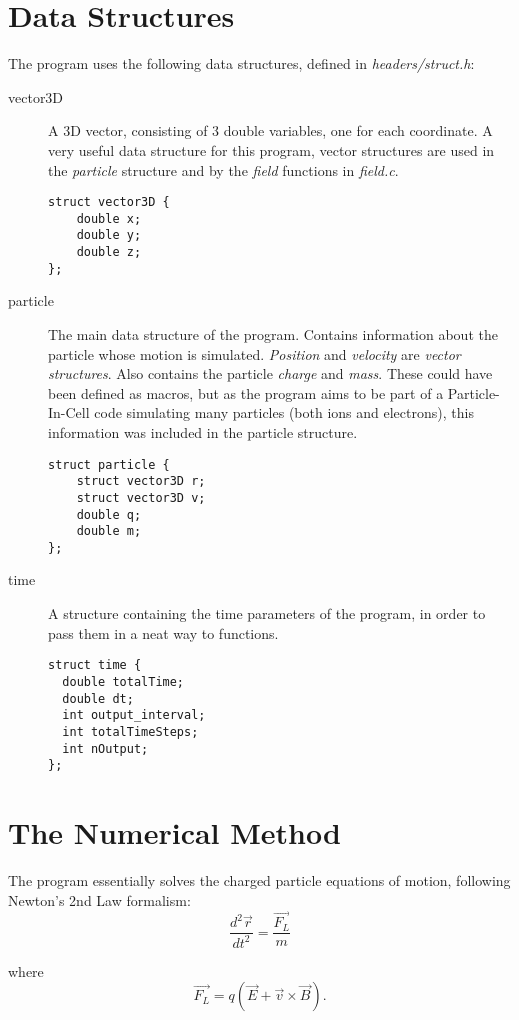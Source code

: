 \documentclass[11pt]{report}
\begin{document}
\section{Data Structures}
The program uses the following data structures, defined in \emph{headers/struct.h}:

\begin{description}
\item[vector3D] A 3D vector, consisting of 3 double variables, one for each coordinate. A very useful data structure for this program, vector structures are used in the \emph{particle} structure and by the \emph{field} functions in \emph{field.c}.
\begin{lstlisting}
struct vector3D {
    double x;
    double y;
    double z;
};
\end{lstlisting}
\item[particle] The main data structure of the program. Contains information about the particle whose motion is simulated. \emph{Position} and \emph{velocity} are \emph{vector structures}. Also contains the particle \emph{charge} and \emph{mass}. These could have been defined as macros, but as the program aims to be part of a Particle-In-Cell code simulating many particles (both ions and electrons), this information was included in the particle structure.
\begin{lstlisting}
struct particle {
    struct vector3D r;
    struct vector3D v;
    double q;
    double m;
};
\end{lstlisting}

\item[time] A structure containing the time parameters of the program, in order to pass them in a neat way 
to functions.
\begin{lstlisting}
struct time {
  double totalTime;
  double dt;
  int output_interval;
  int totalTimeSteps;
  int nOutput;
};
\end{lstlisting}
\end{description}
\newpage
\section{The Numerical Method}
The program essentially solves the charged particle equations of motion, following Newton's 2nd Law formalism:
\begin{equation}
\frac{d^2 \overrightarrow{r}}{dt^2} = \frac{\overrightarrow{F_L}}{m}
\end{equation}

where
\begin{equation}
\overrightarrow{F_L} = q\left(\overrightarrow{E} + \overrightarrow{v} \times \overrightarrow{B} \right).
\end{equation}
\end{document}
